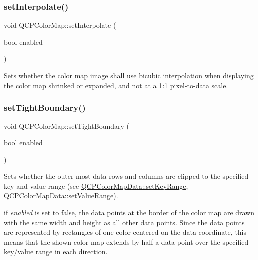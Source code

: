 \subsubsection{\texorpdfstring{set\+Interpolate()}{setInterpolate()}}
{\footnotesize\ttfamily void Q\+C\+P\+Color\+Map\+::set\+Interpolate (\begin{DoxyParamCaption}\item[{bool}]{enabled }\end{DoxyParamCaption})}

Sets whether the color map image shall use bicubic interpolation when displaying the color map shrinked or expanded, and not at a 1\+:1 pixel-\/to-\/data scale.

\mbox{\label{class_q_c_p_color_map_ad03221cc285e5f562a0b13d684b5576d}} 
\subsubsection{\texorpdfstring{set\+Tight\+Boundary()}{setTightBoundary()}}
{\footnotesize\ttfamily void Q\+C\+P\+Color\+Map\+::set\+Tight\+Boundary (\begin{DoxyParamCaption}\item[{bool}]{enabled }\end{DoxyParamCaption})}

Sets whether the outer most data rows and columns are clipped to the specified key and value range (see \hyperlink{class_q_c_p_color_map_data_a0738c485f3c9df9ea1241b7a8bb6a86e}{Q\+C\+P\+Color\+Map\+Data\+::set\+Key\+Range}, \hyperlink{class_q_c_p_color_map_data_ada1b2680ba96a5f4175b6d341cf75d23}{Q\+C\+P\+Color\+Map\+Data\+::set\+Value\+Range}).

if {\itshape enabled} is set to false, the data points at the border of the color map are drawn with the same width and height as all other data points. Since the data points are represented by rectangles of one color centered on the data coordinate, this means that the shown color map extends by half a data point over the specified key/value range in each direction.

\mbox{\label{class_q_c_p_color_map_a53b5d26b28d6027af0fc863f057965db}} 
